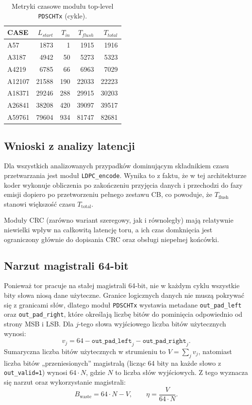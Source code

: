 \begin{table}[!ht]
\centering
\caption{Metryki czasowe modułu top-level \texttt{PDSCHTx} (cykle).}
\label{tab:lat_pdschtx}
\begin{tabular}{lrrrr}
\hline
CASE & $L_{start}$ & $T_{in}$ & $T_{flush}$ & $T_{total}$ \\
\hline
A57     & 1873  & 1   & 1915  & 1916 \\
A3187   & 4942  & 50  & 5273  & 5323 \\
A4219   & 6785  & 66  & 6963  & 7029 \\
A12107  & 21588 & 190 & 22033 & 22223 \\
A18371  & 29246 & 288 & 29915 & 30203 \\
A26841  & 38208 & 420 & 39097 & 39517 \\
A59761  & 79604 & 934 & 81747 & 82681 \\
\hline
\end{tabular}
\end{table}

\subsection{Wnioski z analizy latencji}
\label{subsec:latency_conclusions}

Dla wszystkich analizowanych przypadków dominującym składnikiem czasu przetwarzania jest moduł \texttt{LDPC\_encode}.
Wynika to z faktu, że w tej architekturze koder wykonuje obliczenia po zakończeniu przyjęcia danych i przechodzi do fazy emisji
dopiero po przetworzeniu pełnego zestawu CB, co powoduje, że $T_{\mathrm{flush}}$ stanowi większość czasu $T_{\mathrm{total}}$.

Moduły CRC (zarówno wariant szeregowy, jak i równoległy) mają relatywnie niewielki wpływ na całkowitą latencję toru,
a ich czas domknięcia jest ograniczony głównie do dopisania CRC oraz obsługi niepełnej końcówki.

\subsection{Narzut magistrali 64-bit}
\label{subsec:pdsch_padding_overhead}

Ponieważ tor pracuje na stałej magistrali 64-bit, nie w każdym cyklu wszystkie bity słowa niosą dane użyteczne.
Granice logicznych danych nie muszą pokrywać się z granicami słów, dlatego moduł \texttt{PDSCHTx} wystawia metadane
\texttt{out\_pad\_left} oraz \texttt{out\_pad\_right}, które określają liczbę bitów do pominięcia odpowiednio od strony MSB i LSB.
Dla $j$-tego słowa wyjściowego liczba bitów użytecznych wynosi:
\[
v_j = 64 - \texttt{out\_pad\_left}_j - \texttt{out\_pad\_right}_j.
\]
Sumaryczna liczba bitów użytecznych w strumieniu to $V=\sum_j v_j$, natomiast liczba bitów „przeniesionych” magistralą
(licząc 64 bity na każde słowo z \texttt{out\_valid=1}) wynosi $64\cdot N$, gdzie $N$ to liczba słów wyjściowych.
Z tego wyznacza się narzut oraz wykorzystanie magistrali:
\[
B_{\mathrm{waste}} = 64\cdot N - V,
\qquad
\eta = \frac{V}{64\cdot N}.
\]

